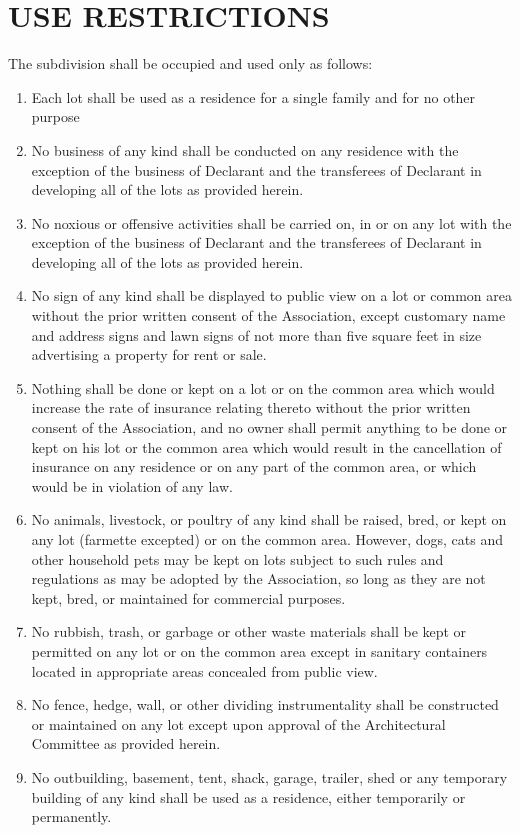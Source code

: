 \documentclass[10pt, letterpaper]{article}
\begin{document}
\section{USE RESTRICTIONS}
The subdivision shall be occupied and used only as follows:
\begin{enumerate}
  \item Each lot shall be used as a residence for a single family and for no other purpose
  \item No business of any kind shall be conducted on any residence with the exception of the business of Declarant and the transferees of Declarant in developing all of the lots as provided herein.
  \item No noxious or offensive activities shall be carried on, in or on any lot with the exception of the business of Declarant and the transferees of Declarant in developing all of the lots as provided herein.
  \item No sign of any kind shall be displayed to public view on a lot or common area without the prior written consent of the Association, except customary name and address signs and lawn signs of not more than five square feet in size advertising a property for rent or sale.
  \item Nothing shall be done or kept on a lot or on the common area which would increase the rate of insurance relating thereto without the prior written consent of the Association, and no owner shall permit anything to be done or kept on his lot or the common area which would result in the cancellation of insurance on any residence or on any part of the common area, or which would be in violation of any law.
  \item No animals, livestock, or poultry of any kind shall be raised, bred, or kept on any lot (farmette excepted) or on the common area.
    However, dogs, cats and other household pets may be kept on lots subject to such rules and regulations as may be adopted by the Association, so long as they are not kept, bred, or maintained for commercial purposes.
  \item No rubbish, trash, or garbage or other waste materials shall be kept or permitted on any lot or on the common area except in sanitary containers located in appropriate areas concealed from public view.
  \item No fence, hedge, wall, or other dividing instrumentality shall be constructed or maintained on any lot except upon approval of the Architectural Committee as provided herein.
  \item No outbuilding, basement, tent, shack, garage, trailer, shed or any temporary building of any kind shall be used as a residence, either temporarily or permanently.

\end{enumerate}
\end{document}
